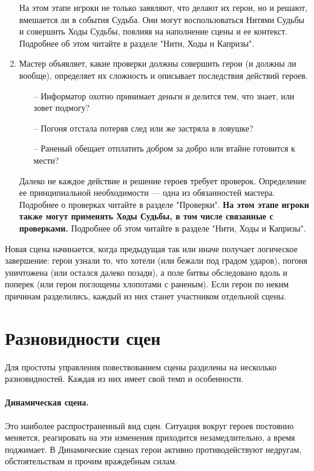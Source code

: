 \begin{enumerate}
\begin{itemize}
\end{itemize}
На этом этапе игроки не только заявляют, что делают их герои, но и решают, вмешается ли в события Судьба. Они могут воспользоваться Нитями Судьбы и совершить Ходы Судьбы, повлияв на наполнение сцены и ее контекст. Подробнее об этом читайте в разделе "Нити, Ходы и Капризы".
\item Мастер объявляет, какие проверки должны совершить герои (и должны ли вообще), определяет их сложность и описывает последствия действий героев.
\begin{itemize}
\item[--] Информатор охотно принимает деньги и делится тем, что знает, или зовет подмогу?
\item[--]  Погоня отстала потеряв след или же застряла в ловушке?
\item[--]  Раненый обещает отплатить добром за добро или втайне готовится к мести?
\end{itemize}
Далеко не каждое действие и решение героев требует проверок. Определение ее принципиальной необходимости — одна из обязанностей мастера. Подробнее о проверках читайте в разделе "Проверки".
\linebreak \textbf{На этом этапе игроки также могут применять Ходы Судьбы, в том числе связанные с проверками.} Подробнее об этом читайте в разделе "Нити, Ходы и Капризы".
\end{enumerate}
Новая сцена начинается, когда предыдущая так или иначе получает логическое завершение: герои узнали  то, что хотели (или бежали под градом ударов), погоня уничтожена (или остался далеко позади), а поле битвы обследовано вдоль и поперек (или герои поглощены хлопотами с раненым). Если герои по неким причинам разделились, каждый из них станет участником отдельной сцены.

\section{Разновидности сцен}
Для простоты управления повествованием сцены разделены на несколько разновидностей. Каждая из них имеет свой темп и особенности. 
\paragraph{Динамическая сцена.} Это наиболее распространенный вид сцен. Ситуация вокруг героев постоянно меняется, реагировать на эти изменения приходится незамедлительно, а время поджимает. В Динамические сценах герои активно противодействуют недругам, обстоятельствам и прочим враждебным силам. 
